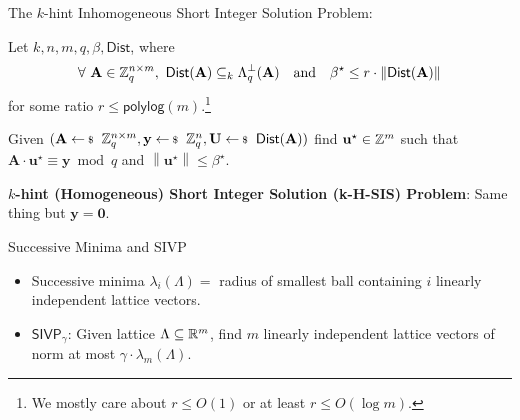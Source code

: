 \documentclass[xcolor=table,10pt,aspectratio=169]{beamer}
\renewcommand{\vec}[1]{\ensuremath{\mathbf{#1}}\xspace}
\newcommand{\norm}[1]{\left\lVert#1\right\rVert}
\providecommand{\mat}[1]{\ensuremath{\vec{#1}}\xspace}
\newcommand{\SIVP}{\ensuremath{\mathsf{SIVP}}\xspace}
\begin{document}
\begin{frame}[label={sec:org6c7463d}]{The \(k\)-hint Inhomogeneous Short Integer Solution Problem:}
\begin{definition}[k-H-ISIS]
Let \(k,n,m,q,\beta,\mathsf{Dist}\), where
\[\begin{aligned}
  \forall~\mat{A} \in \ZZ_q^{n \times m},~\mathsf{Dist}(\mat{A}) \subseteq_k \Lambda_q^\bot(\mat{A}) && \text{and} && \beta^{\star} \leq r \cdot \norm{\mathsf{Dist}(\mat{A})}          
  \end{aligned}
\]
for some ratio \(r \leq \mathsf{polylog}(m)\).\footnote{We mostly care about \(r \leq O(1)\) or at least \(r \leq O(\log m)\).}

Given \((\mat{A} \sample \ZZ_q^{n \times m}, \vec{y} \sample \ZZ_q^n, \mat{U} \sample \mathsf{Dist}(\mat{A}))\) find
\(\vec{u}^{\star} \in \ZZ^m\) such that \(\mat{A} \cdot\vec{u}^{\star} \equiv \vec{y} \bmod q\) and \(\norm{\vec{u}^\star} \leq \beta^{\star}\).
\label{def:khISIS}
\end{definition}

\textbf{\(k\)-hint (Homogeneous) Short Integer Solution (k-H-SIS) Problem}: Same thing but \(\vec{y} = \vec{0}\).
\end{frame}

\begin{frame}[label={sec:org1b0f388}]{Successive Minima and SIVP}
\begin{itemize}
\item Successive minima \(\lambda_i(\Lambda) =\) radius of smallest ball containing \(i\) linearly independent lattice vectors.

\item \(\SIVP_\gamma\): Given lattice \(\Lambda \subseteq \mathbb{R}^m\), find \(m\) linearly independent lattice vectors of norm at most \(\gamma \cdot \lambda_m(\Lambda)\).
\end{itemize}
\end{frame}
\end{document}
